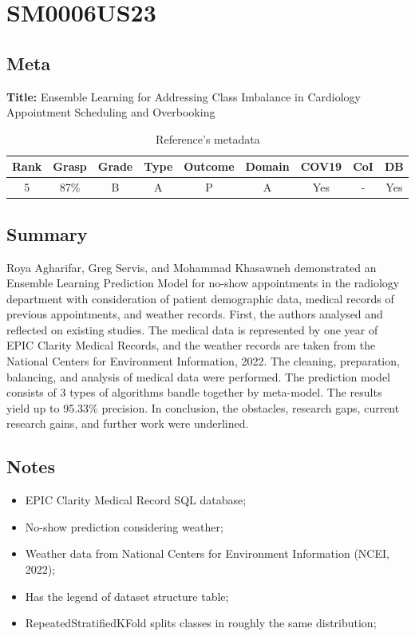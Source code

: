 \section{ SM0006US23 }


\subsection{Meta}

    \textbf{Title:}
    Ensemble Learning for Addressing Class Imbalance in Cardiology Appointment Scheduling and Overbooking

    \begin{table}[H]
        \centering
        \begin{tabular}{|c|c|c|c|c|c|c|c|c|}
            \hline
                \textbf{Rank} & \textbf{Grasp} & \textbf{Grade} & \textbf{Type} & \textbf{Outcome} & \textbf{Domain} & \textbf{COV19} & \textbf{CoI} & \textbf{DB} \\
            \hline
                5 & 87\% & B & A & P & A & Yes & - & Yes \\
            \hline
        \end{tabular}
        \caption{Reference's metadata}
        \label{tab:SM0006US23}
    \end{table}

\subsection{Summary}
Roya Agharifar, Greg Servis, and Mohammad Khasawneh demonstrated an Ensemble Learning Prediction Model for no-show appointments in the radiology department with consideration of patient demographic data, medical records of previous appointments, and weather records. First, the authors analysed and reflected on existing studies. The medical data is represented by one year of EPIC Clarity Medical Records, and the weather records are taken from the National Centers for Environment Information, 2022. The cleaning, preparation, balancing, and analysis of medical data were performed. The prediction model consists of 3 types of algorithms bandle together by meta-model. The results yield up to 95.33\% precision. In conclusion, the obstacles, research gaps, current research gains, and further work were underlined.
    

\subsection{Notes}
    \begin{itemize}
        \item EPIC Clarity Medical Record SQL database;
        \item No-show prediction considering weather;
        \item Weather data from National Centers for Environment Information (NCEI, 2022);
        \item Has the legend of dataset structure table;
        \item RepeatedStratifiedKFold splits classes in roughly the same distribution;
    \end{itemize}


